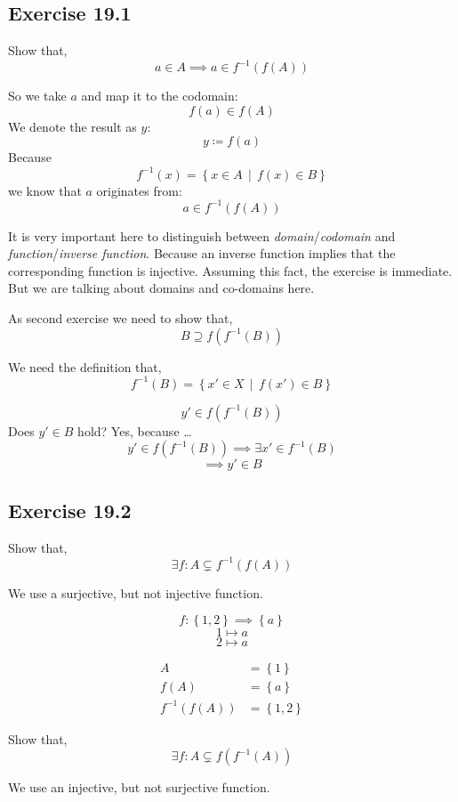 \documentclass[a4paper]{article}
\theoremstyle{definition}
\newcommand\set[1]{\left\{#1\right\}}
\newcommand\setdef[2]{\left\{#1\,\middle|\,#2\right\}}
\begin{document}
\subsection{Exercise 19.1}


Show that,
\[ a \in A \implies a \in f^{-1}(f(A)) \]

So we take $a$ and map it to the codomain:
\[ f(a) \in f(A) \]
We denote the result as $y$:
\[ y \coloneqq f(a) \]
Because
\[ f^{-1}(x) = \setdef{x \in A}{f(x) \in B} \]
we know that $a$ originates from:
\[ a \in f^{-1}(f(A)) \]

It is very important here to distinguish between \emph{domain}/\emph{codomain}
and \emph{function}/\emph{inverse function}. Because an inverse function implies
that the corresponding function is injective. Assuming this fact, the exercise
is immediate. But we are talking about domains and co-domains here.

As second exercise we need to show that,
\[ B \supseteq f\left(f^{-1}\left(B\right)\right) \]

We need the definition that,
\[ f^{-1}(B) = \setdef{x' \in X}{f(x') \in B} \]

\[ y' \in f(f^{-1}(B)) \]
Does $y' \in B$ hold? Yes, because \dots
\[ y' \in f\left(f^{-1}(B)\right) \implies \exists x' \in f^{-1}(B) \]
\[ \implies y' \in B \]

\subsection{Exercise 19.2}

Show that,
\[ \exists f: A \subsetneq f^{-1}(f(A)) \]

We use a surjective, but not injective function.

\[ f: \set{1,2} \implies \set{a} \]
\[ 1 \mapsto a \]
\[ 2 \mapsto a \]

\begin{align*}
  A &= \set{1} \\
  f(A) &= \set{a} \\
  f^{-1}(f(A)) &= \set{1, 2}
\end{align*}

Show that,
\[ \exists f: A \subsetneq f(f^{-1}(A)) \]

We use an injective, but not surjective function.
\end{document}
